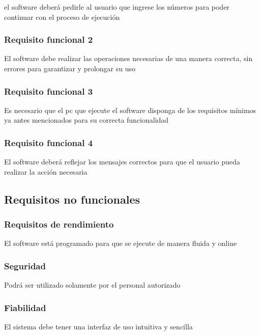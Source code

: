 \documentclass[11pt]{article}
\begin{document}
el software deberá pedirle al usuario que ingrese los números para
poder continuar con el proceso de ejecución

\subsubsection{Requisito funcional 2}

El software debe realizar las operaciones necesarias de una manera 
correcta, sin errores para garantizar y prolongar su uso

\subsubsection{Requisito funcional 3}

Es necesario que el pc que ejecute el software disponga de los 
requisitos mínimos ya antes mencionados para su correcta 
funcionalidad

\subsubsection{Requisito funcional 4}

El software deberá reflejar los mensajes correctos para que el 
usuario pueda realizar la acción necesaria

\subsection{\textbf{Requisitos no funcionales}}

\subsubsection{Requisitos de rendimiento}

El software está programado para que se ejecute de manera fluida y
online

\subsubsection{Seguridad}

Podrá ser utilizado solamente por el personal autorizado

\subsubsection{Fiabilidad}

El sistema debe tener una interfaz de uso intuitiva y sencilla
\end{document}
